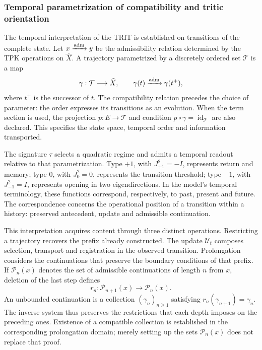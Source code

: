 \subsubsection{Temporal parametrization of compatibility and tritic orientation}
\label{trit-temporal-compatibilidad}

The temporal interpretation of the TRIT is established on transitions of the
complete state. Let \(x\xrightarrow{\rm adm}y\) be the admissibility relation determined
by the TPK operations on \(\widehat X\). A trajectory parametrized
by a discretely ordered set \(\mathcal T\) is a map
\[
 \gamma:\mathcal T\longrightarrow\widehat X,\qquad
 \gamma(t)\xrightarrow{\rm adm}\gamma(t^+),
\]
where \(t^+\) is the successor of \(t\). The compatibility relation precedes
the choice of parameter: the order expresses its transitions as
an evolution. When the term section is used, the
projection \(p:E\to\mathcal T\) and condition
\(p\circ\gamma=\operatorname{id}_{\mathcal T}\) are also declared. This specifies
the state space, temporal order and information transported.

The signature \(\tau\) selects a quadratic regime and admits a
temporal readout relative to that parametrization. Type \(+1\), with
\(J_{+1}^{2}=-I\), represents return and memory; type \(0\), with
\(J_0^{2}=0\), represents the transition threshold; type \(-1\), with
\(J_{-1}^{2}=I\), represents opening in two eigendirections. In the
model's temporal terminology, these functions correspond,
respectively, to past, present and future. The correspondence concerns
the operational position of a transition within a history:
preserved antecedent, update and admissible continuation.

This interpretation acquires content through three distinct operations.
Restricting a trajectory recovers the prefix already constructed. The
update \(\mathcal U_t\) composes selection, transport and registration in
the observed transition. Prolongation considers the continuations that
preserve the boundary conditions of that prefix. If
\(\mathcal P_n(x)\) denotes the set of admissible continuations of
length \(n\) from \(x\), deletion of the last step defines
\[
 r_n:\mathcal P_{n+1}(x)\longrightarrow\mathcal P_n(x).
\]
An unbounded continuation is a collection \((\gamma_n)_{n\geq1}\) satisfying
\(r_n(\gamma_{n+1})=\gamma_n\). The inverse system thus preserves
the restrictions that each depth imposes on the preceding
ones. Existence of a compatible collection is established in the
corresponding prolongation domain; merely setting up the
sets \(\mathcal P_n(x)\) does not replace that proof.

